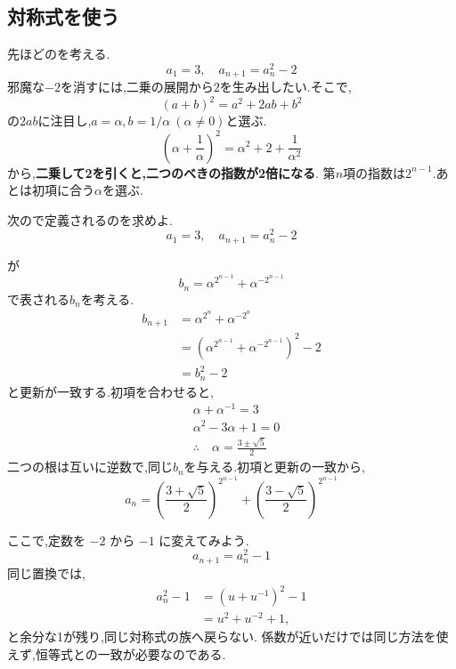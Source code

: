 \subsection{対称式を使う}\label{節：基本対称式型}
先ほどのを考える.
\[
  a_1=3, \quad a_{n+1}=a_n^2-2
\]
邪魔な$-2$を消すには,二乗の展開から$2$を生み出したい.そこで,
\[
  (a+b)^2=a^2+2ab+b^2
\]
の$2ab$に注目し,$a=\alpha,b=1/\alpha\ (\alpha\ne0)$と選ぶ.
\[
  \left(\alpha+\frac{1}{\alpha}\right)^2=\alpha^2+2+\frac{1}{\alpha^2}
\]
から,\textbf{二乗して2を引くと,二つのべきの指数が2倍になる}.
第$n$項の指数は$2^{n-1}$.あとは初項に合う$\alpha$を選ぶ.

\noindent {}\par\nobreak
\begin{smallquote}
  次ので定義されるのを求めよ.
  \[
    a_1=3, \quad a_{n+1}=a_n^2-2
  \]
\end{smallquote}
  \begin{smallquote}
  が
    \[
      b_n=\alpha^{2^{n-1}}+\alpha^{-2^{n-1}}
    \]
    で表される$b_n$を考える.
    \begin{align*}
      b_{n+1}&=\alpha^{2^{n}}+\alpha^{-2^{n}}\\
      &=\left(\alpha^{2^{n-1}}+\alpha^{-2^{n-1}}\right)^2-2\\
      &=b_n^2-2
    \end{align*}
    と更新が一致する.初項を合わせると,
    \begin{align*}
      &\alpha+\alpha^{-1}=3\\
      &\alpha^2-3\alpha+1=0\\
      &\therefore \quad \alpha=\frac{3\pm \sqrt{5}}{2}
    \end{align*}
    二つの根は互いに逆数で,同じ$b_n$を与える.初項と更新の一致から,
    \[
      a_n=\left(\frac{3+ \sqrt{5}}{2}\right)^{2^{n-1}}+\left(\frac{3- \sqrt{5}}{2}\right)^{2^{n-1}}
    \]
  \end{smallquote}

ここで,定数を $-2$ から $-1$ に変えてみよう.
\[
  a_{n+1}=a_n^2-1
\]
同じ置換では,
\begin{align*}
  a_n^2-1
    &=\left(u+u^{-1}\right)^2-1\\
    &=u^2+u^{-2}+1,
\end{align*}
と余分な1が残り,同じ対称式の族へ戻らない.
係数が近いだけでは同じ方法を使えず,恒等式との一致が必要なのである.

